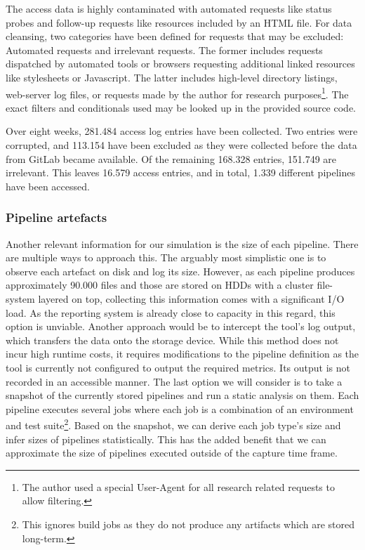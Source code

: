     The access data is highly contaminated with automated requests like status probes and follow-up requests like resources included by an HTML file. For data cleansing, two categories have been defined for requests that may be excluded: Automated requests and irrelevant requests. The former includes requests dispatched by automated tools or browsers requesting additional linked resources like stylesheets or Javascript. The latter includes high-level directory listings, web-server log files, or requests made by the author for research purposes\footnote{The author used a special User-Agent for all research related requests to allow filtering.}. The exact filters and conditionals used may be looked up in the provided source code.
    
    Over eight weeks, 281.484 access log entries have been collected. Two entries were corrupted, and 113.154 have been excluded as they were collected before the data from GitLab became available. Of the remaining 168.328 entries, 151.749 are irrelevant. This leaves 16.579 access entries, and in total, 1.339 different pipelines have been accessed.

\subsubsection{Pipeline artefacts}\label{sec:data-source-sizes}
    Another relevant information for our simulation is the size of each pipeline. There are multiple ways to approach this. The arguably most simplistic one is to observe each artefact on disk and log its size. However, as each pipeline produces approximately 90.000 files and those are stored on HDDs with a cluster file-system layered on top, collecting this information comes with a significant I/O load. As the reporting system is already close to capacity in this regard, this option is unviable. Another approach would be to intercept the tool's log output, which transfers the data onto the storage device. While this method does not incur high runtime costs, it requires modifications to the pipeline definition as the tool is currently not configured to output the required metrics. Its output is not recorded in an accessible manner. The last option we will consider is to take a snapshot of the currently stored pipelines and run a static analysis on them. Each pipeline executes several jobs where each job is a combination of an environment and test suite\footnote{This ignores build jobs as they do not produce any artifacts which are stored long-term.}. Based on the snapshot, we can derive each job type's size and infer sizes of pipelines statistically. This has the added benefit that we can approximate the size of pipelines executed outside of the capture time frame.
    
